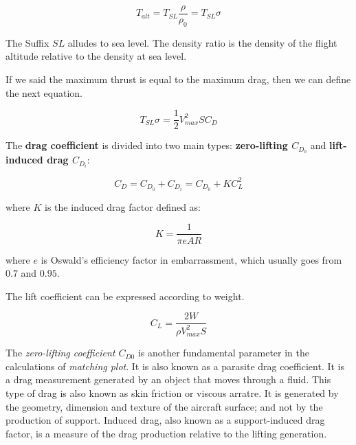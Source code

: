 \begin{equation}
    T_{alt} = T_{SL} \frac{\rho}{\rho_0} = T_{SL} \sigma
\end{equation}

The Suffix $SL$ alludes to sea level. The density ratio is the density of the flight altitude relative to the density at sea level.

If we said the maximum thrust is equal to the maximum drag, then we can define the next equation. 

\begin{equation}
\label{empuje nivel del mar}
    T_{SL} \sigma = \frac{1}{2} V_{max}^2 S C_D
\end{equation}

The \textbf{drag coefficient} is divided into two main types: \textbf{zero-lifting $C_{D_0}$} and \textbf{lift-induced drag $C_{D_i}$}:

\begin{equation}
    C_D = C_{D_0} + C_{D_i} = C_{D_0} +  K C_{L}^2 
\end{equation}

where $K$ is the induced drag factor defined as:

\begin{equation}
    K = \frac{1}{\pi e AR}
\end{equation}

where $e$ is Oswald's efficiency factor in embarrassment, which usually goes from $0.7$ and $0.95$. 


The lift coefficient can be expressed according to weight. 

\begin{equation}
\label{levantamiento peso}
    C_{L} = \frac{2W}{\rho V_{max}^2 S}
\end{equation}

The \textit{zero-lifting coefficient $C_{D0}$} is another fundamental parameter in the calculations of \textit{matching plot}. It is also known as a parasite drag coefficient. It is a drag measurement generated by an object that moves through a fluid. This type of drag is also known as skin friction or viscous arratre. It is generated by the geometry, dimension and texture of the aircraft surface; and not by the production of support. Induced drag, also known as a support-induced drag factor, is a measure of the drag production relative to the lifting generation. 

